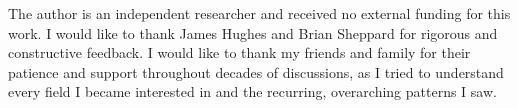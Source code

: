 \begin{acknowledgments}
The author is an independent researcher and received no external funding for this work. I would like to thank James Hughes and Brian Sheppard for rigorous and constructive feedback. I would like to thank my friends and family for their patience and support throughout decades of discussions, as I tried to understand every field I became interested in and the recurring, overarching patterns I saw.
\end{acknowledgments}